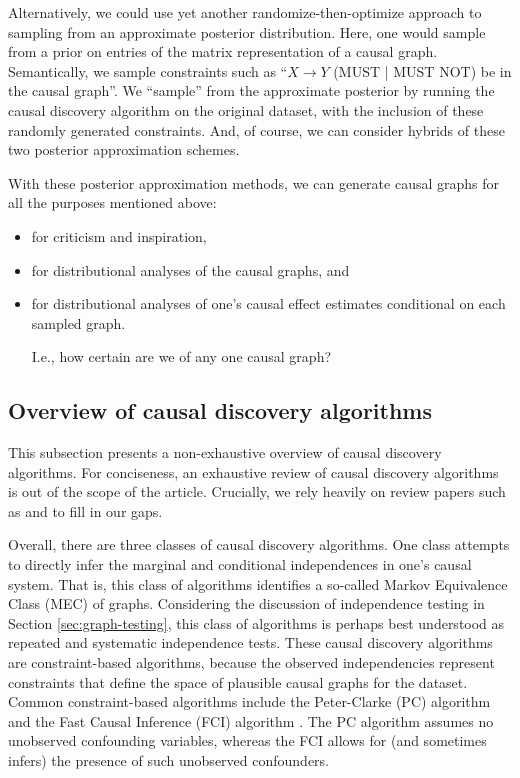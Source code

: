 Alternatively, we could use yet another randomize-then-optimize \citep{bardsley_2014_randomize, orabona_2014_measure} approach to sampling from an approximate posterior distribution.
Here, one would sample from a prior on entries of the matrix representation of a causal graph.
Semantically, we sample constraints such as ``$X \rightarrow Y$ (MUST | MUST NOT) be in the causal graph''.
We ``sample'' from the approximate posterior by running the causal discovery algorithm on the original dataset, with the inclusion of these randomly generated constraints.
And, of course, we can consider hybrids of these two posterior approximation schemes.

With these posterior approximation methods, we can generate causal graphs for all the purposes mentioned above:
\begin{itemize}
   \item for criticism and inspiration,
   \item for distributional analyses of the causal graphs, and
   \item for distributional analyses of one's causal effect estimates conditional on each sampled graph.

   \newline
   I.e., how certain are we of any one causal graph?
\end{itemize}

\subsection{Overview of causal discovery algorithms}
\label{sec:discovery-overview}

This subsection presents a non-exhaustive overview of causal discovery algorithms.
For conciseness, an exhaustive review of causal discovery algorithms is out of the scope of the article.
Crucially, we rely heavily on review papers such as \citet{glymour_2019_review} and \citet{spirtes_2016_causal} to fill in our gaps.


Overall, there are three classes of causal discovery algorithms.
One class attempts to directly infer the marginal and conditional independences in one's causal system.
That is, this class of algorithms identifies a so-called Markov Equivalence Class (MEC) of graphs.
Considering the discussion of independence testing in Section \ref{sec:graph-testing}, this class of algorithms is perhaps best understood as repeated and systematic independence tests.
These causal discovery algorithms are constraint-based algorithms, because the observed independencies represent constraints that define the space of plausible causal graphs for the dataset.
Common constraint-based algorithms include the Peter-Clarke (PC) algorithm and the Fast Causal Inference (FCI) algorithm \citep{glymour_2001_causation}.
The PC algorithm assumes no unobserved confounding variables, whereas the FCI allows for (and sometimes infers) the presence of such unobserved confounders.

